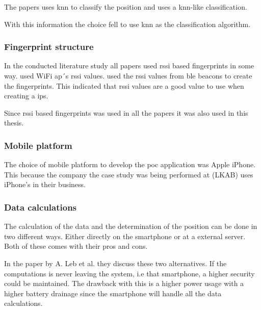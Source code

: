 \bigskip

The papers \cite{BluetoothLowEnergy2018, DevelopmentSmartphoneBasedUniversity2021} uses \acrshort{knn} to classify the position and \cite{PracticalFingerprintingLocalization2017} uses a \acrshort{knn}-like classification.

\bigskip

With this information the choice fell to use \acrshort{knn} as the classification algorithm.

\subsubsection{Fingerprint structure}\label{sec:methodSoftwareDesignFingerprint}
In the conducted literature study all papers used \acrfull{rssi} based fingerprints in some way.
\cite{DevelopmentSmartphoneBasedUniversity2021, IndoorPositioningSystem2010} used WiFi \acrfull{ap}´s \acrshort{rssi} values.
\cite{BluetoothLowEnergy2018, PracticalFingerprintingLocalization2017, ComprehensiveStudyBluetooth2013} used the \acrshort{rssi} values from \acrshort{ble} beacons to create the fingerprints.
This indicated that \acrshort{rssi} values are a good value to use when creating a \acrshort{ips}.
\bigskip

Since \acrshort{rssi} based fingerprints was used in all the papers it was also used in this thesis.


\subsubsection{Mobile platform}\label{sec:methodSoftwareDesignMobilePlatform}
The choice of mobile platform to develop the \acrlong{poc} application was Apple iPhone.
This because the company the case study was being performed at (LKAB) uses iPhone's in their business.

\subsubsection{Data calculations}\label{sec:methodSoftwareDesignData}
The calculation of the data and the determination of the position can be done in two different ways.
Either directly on the smartphone or at a external server. 
Both of these comes with their pros and cons.

\bigskip

In the paper \cite{DevelopmentSmartphoneBasedUniversity2021} by A. Leb et al. they discuss these two alternatives.
If the computations is never leaving the system, i.e that smartphone, a higher security could be maintained. 
The drawback with this is a higher power usage with a higher battery drainage since the smartphone will handle all the data calculations.

